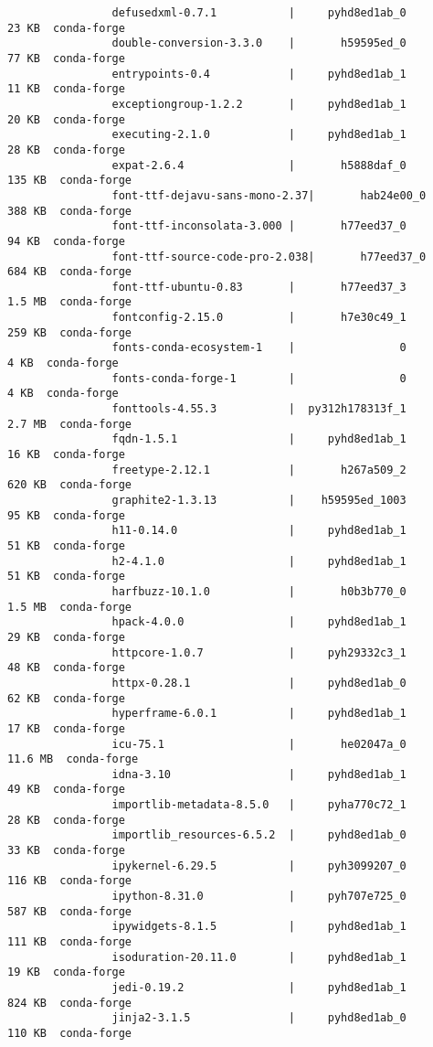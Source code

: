 \documentclass{article}
\begin{document}
\begin{itemize}
\begin{itemize}
\begin{itemize}
\begin{verbatim}
				defusedxml-0.7.1           |     pyhd8ed1ab_0          23 KB  conda-forge
				double-conversion-3.3.0    |       h59595ed_0          77 KB  conda-forge
				entrypoints-0.4            |     pyhd8ed1ab_1          11 KB  conda-forge
				exceptiongroup-1.2.2       |     pyhd8ed1ab_1          20 KB  conda-forge
				executing-2.1.0            |     pyhd8ed1ab_1          28 KB  conda-forge
				expat-2.6.4                |       h5888daf_0         135 KB  conda-forge
				font-ttf-dejavu-sans-mono-2.37|       hab24e00_0         388 KB  conda-forge
				font-ttf-inconsolata-3.000 |       h77eed37_0          94 KB  conda-forge
				font-ttf-source-code-pro-2.038|       h77eed37_0         684 KB  conda-forge
				font-ttf-ubuntu-0.83       |       h77eed37_3         1.5 MB  conda-forge
				fontconfig-2.15.0          |       h7e30c49_1         259 KB  conda-forge
				fonts-conda-ecosystem-1    |                0           4 KB  conda-forge
				fonts-conda-forge-1        |                0           4 KB  conda-forge
				fonttools-4.55.3           |  py312h178313f_1         2.7 MB  conda-forge
				fqdn-1.5.1                 |     pyhd8ed1ab_1          16 KB  conda-forge
				freetype-2.12.1            |       h267a509_2         620 KB  conda-forge
				graphite2-1.3.13           |    h59595ed_1003          95 KB  conda-forge
				h11-0.14.0                 |     pyhd8ed1ab_1          51 KB  conda-forge
				h2-4.1.0                   |     pyhd8ed1ab_1          51 KB  conda-forge
				harfbuzz-10.1.0            |       h0b3b770_0         1.5 MB  conda-forge
				hpack-4.0.0                |     pyhd8ed1ab_1          29 KB  conda-forge
				httpcore-1.0.7             |     pyh29332c3_1          48 KB  conda-forge
				httpx-0.28.1               |     pyhd8ed1ab_0          62 KB  conda-forge
				hyperframe-6.0.1           |     pyhd8ed1ab_1          17 KB  conda-forge
				icu-75.1                   |       he02047a_0        11.6 MB  conda-forge
				idna-3.10                  |     pyhd8ed1ab_1          49 KB  conda-forge
				importlib-metadata-8.5.0   |     pyha770c72_1          28 KB  conda-forge
				importlib_resources-6.5.2  |     pyhd8ed1ab_0          33 KB  conda-forge
				ipykernel-6.29.5           |     pyh3099207_0         116 KB  conda-forge
				ipython-8.31.0             |     pyh707e725_0         587 KB  conda-forge
				ipywidgets-8.1.5           |     pyhd8ed1ab_1         111 KB  conda-forge
				isoduration-20.11.0        |     pyhd8ed1ab_1          19 KB  conda-forge
				jedi-0.19.2                |     pyhd8ed1ab_1         824 KB  conda-forge
				jinja2-3.1.5               |     pyhd8ed1ab_0         110 KB  conda-forge

\end{verbatim}
\end{itemize}
\end{itemize}
\end{itemize}
\end{document}
